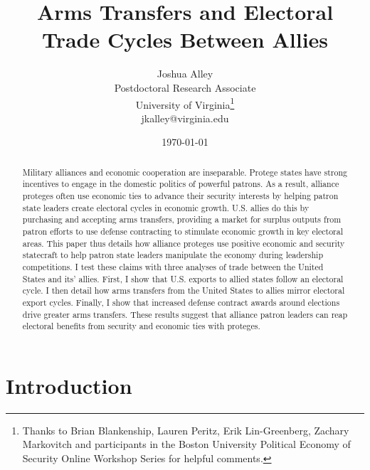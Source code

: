 \documentclass[12pt]{article}
\title{\textbf{Arms Transfers and Electoral Trade Cycles Between Allies}}
\author{Joshua Alley \\
Postdoctoral Research Associate \\
University of Virginia\thanks{Thanks to Brian Blankenship, Lauren Peritz, Erik Lin-Greenberg, Zachary Markovitch and participants in the Boston University Political Economy of Security Online Workshop Series for helpful comments.} \\
jkalley@virginia.edu
}
\date{\today}
\begin{document}
\maketitle 

\begin{abstract}
Military alliances and economic cooperation are inseparable. 
Protege states have strong incentives to engage in the domestic politics of powerful patrons. 
As a result, alliance proteges often use economic ties to advance their security interests by helping patron state leaders create electoral cycles in economic growth. 
U.S. allies do this by purchasing and accepting arms transfers, providing a market for surplus outputs from patron efforts to use defense contracting to stimulate economic growth in key electoral areas.
This paper thus details how alliance proteges use positive economic and security statecraft to help patron state leaders manipulate the economy during leadership competitions.  
I test these claims with three analyses of trade between the United States and its' allies. 
First, I show that U.S. exports to allied states follow an electoral cycle. 
I then detail how arms transfers from the United States to allies mirror electoral export cycles. 
Finally, I show that increased defense contract awards around elections drive greater arms transfers.
These results suggest that alliance patron leaders can reap electoral benefits from security and economic ties with proteges. 
\end{abstract} 


\newpage 
\doublespace 


\section{Introduction}

\end{document}
